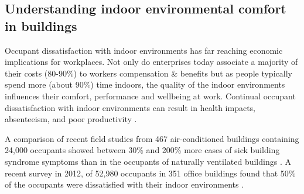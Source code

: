\documentclass[]{interact}
\theoremstyle{plain}%
\theoremstyle{definition}
\theoremstyle{remark}
\begin{document}
\subsection{Understanding indoor environmental comfort in buildings}
Occupant dissatisfaction with indoor environments has far reaching economic implications for workplaces. %
Not only do enterprises today associate a majority of their costs (80-90\%) to workers compensation \& benefits \citep{Creativeandproductiveworkplaces, kats2003green, wilson2005making} but as people typically spend more (about 90\%) time indoors, the quality of the indoor environments influences their comfort, performance and wellbeing at work. Continual occupant dissatisfaction with indoor environments can result in health impacts, absenteeism, and poor productivity \citep{MiltonDonaldK.P.MarkGlencross2000}.    


A comparison of recent field studies from 467 air-conditioned buildings containing 24,000 occupants showed between 30\% and 200\% more cases of sick building syndrome symptoms than in the occupants of naturally ventilated buildings \citep{Evolvingopportunities, ventilationsystemtype}. A recent survey in 2012, of 52,980 occupants in 351 office buildings found that 50\% of the occupants were dissatisfied with their indoor environments \citep{Frontczak2012QuantitativeDesign}. 
\end{document}

